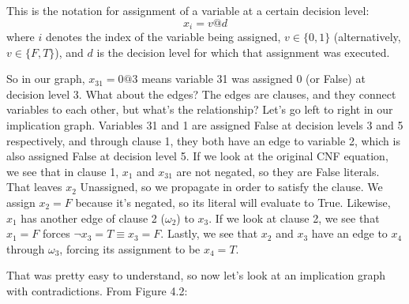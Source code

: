 \begin{center}
    This is the notation for assignment of a variable at a certain decision level:
    $$x_i = v@d$$
    where $i$ denotes the index of the variable being assigned, $v \in \{0, 1\}$
    (alternatively, $v \in \{F, T\}$), and $d$ is the decision level for which that 
    assignment was executed.
\end{center}

So in our graph, $x_{31} = 0 @ 3$ means variable 31 was assigned 0 (or False) at
decision level 3. What about the edges? The edges are clauses, and they connect
variables to each other, but what's the relationship? Let's go left to right in our 
implication graph. Variables 31 and 1 are assigned False at decision levels 3 and 5
respectively, and through clause 1, they both have an edge to variable 2, which is also 
assigned False at decision level 5. If we look at the original CNF equation, we see that 
in clause 1, $x_1$ and $x_{31}$ are not negated, so they are False literals. That leaves 
$x_2$ Unassigned, so we propagate in order to satisfy the clause. We assign $x_2 = F$ 
because it's negated, so its literal will evaluate to True. Likewise, $x_1$ has another 
edge of clause 2 ($\omega_2$) to $x_3$. If we look at clause 2, we see that $x_1 = F$ 
forces $\neg x_3 = T \equiv x_3 = F$. Lastly, we see that $x_2$ and $x_3$ have an edge 
to $x_4$ through $\omega_3$, forcing its assignment to be $x_4 = T$.

That was pretty easy to understand, so now let's look at an implication graph with 
contradictions. From Figure 4.2:

